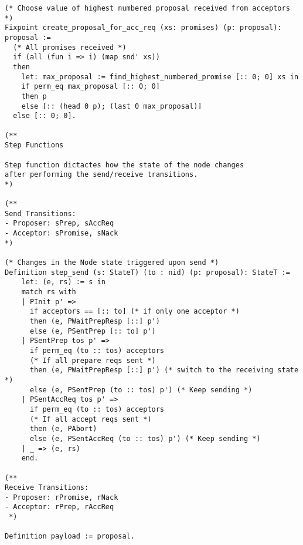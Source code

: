 \begin{landscape}
\begin{multicols*}{2}
\begin{lstlisting}[style=SourceCodeListing]
(* Choose value of highest numbered proposal received from acceptors *)
Fixpoint create_proposal_for_acc_req (xs: promises) (p: proposal): proposal :=
  (* All promises received *)
  if (all (fun i => i) (map snd' xs))
  then
    let: max_proposal := find_highest_numbered_promise [:: 0; 0] xs in
    if perm_eq max_proposal [:: 0; 0]
    then p
    else [:: (head 0 p); (last 0 max_proposal)]
  else [:: 0; 0].

(**
Step Functions

Step function dictactes how the state of the node changes
after performing the send/receive transitions.
*)

(**
Send Transitions:
- Proposer: sPrep, sAccReq
- Acceptor: sPromise, sNack
*)

(* Changes in the Node state triggered upon send *)
Definition step_send (s: StateT) (to : nid) (p: proposal): StateT :=
    let: (e, rs) := s in
    match rs with
    | PInit p' =>
      if acceptors == [:: to] (* if only one acceptor *)
      then (e, PWaitPrepResp [::] p')
      else (e, PSentPrep [:: to] p')
    | PSentPrep tos p' =>
      if perm_eq (to :: tos) acceptors
      (* If all prepare reqs sent *)
      then (e, PWaitPrepResp [::] p') (* switch to the receiving state *)
      else (e, PSentPrep (to :: tos) p') (* Keep sending *)
    | PSentAccReq tos p' =>
      if perm_eq (to :: tos) acceptors
      (* If all accept reqs sent *)
      then (e, PAbort)
      else (e, PSentAccReq (to :: tos) p') (* Keep sending *)
    | _ => (e, rs)
    end.

(**
Receive Transitions:
- Proposer: rPromise, rNack
- Acceptor: rPrep, rAccReq
 *)

Definition payload := proposal.


\end{lstlisting}
\end{multicols*}
\end{landscape}

